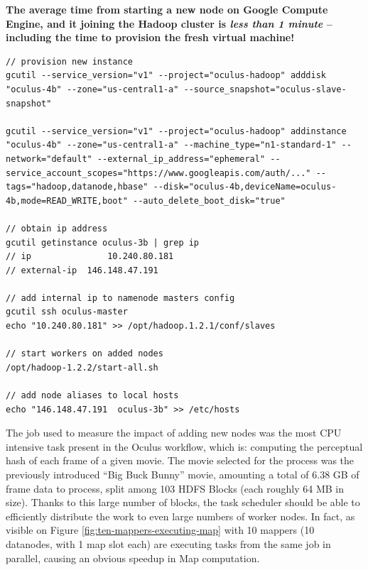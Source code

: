 \textbf{The average time from starting a new node on Google Compute Engine, and it joining the Hadoop cluster is \textit{less than 1 minute} -- including the time to provision the fresh virtual machine!}

\newpage
\begin{lstlisting}[caption={Complete listing of adding a new worker node to the cluster, using GCE}, label={lst:adding-new-node-cluster}]
// provision new instance
gcutil --service_version="v1" --project="oculus-hadoop" adddisk "oculus-4b" --zone="us-central1-a" --source_snapshot="oculus-slave-snapshot"

gcutil --service_version="v1" --project="oculus-hadoop" addinstance "oculus-4b" --zone="us-central1-a" --machine_type="n1-standard-1" --network="default" --external_ip_address="ephemeral" --service_account_scopes="https://www.googleapis.com/auth/..." --tags="hadoop,datanode,hbase" --disk="oculus-4b,deviceName=oculus-4b,mode=READ_WRITE,boot" --auto_delete_boot_disk="true"

// obtain ip address
gcutil getinstance oculus-3b | grep ip
// ip               10.240.80.181
// external-ip  146.148.47.191

// add internal ip to namenode masters config
gcutil ssh oculus-master
echo "10.240.80.181" >> /opt/hadoop.1.2.1/conf/slaves

// start workers on added nodes
/opt/hadoop-1.2.2/start-all.sh

// add node aliases to local hosts
echo "146.148.47.191  oculus-3b" >> /etc/hosts
\end{lstlisting}

The job used to measure the impact of adding new nodes was the most CPU intensive task present in the Oculus workflow, which is: computing the perceptual hash of each frame of a given movie. The movie selected for the process was the previously introduced ``Big Buck Bunny'' movie, amounting a total of 6.38 GB of frame data to process, split among 103 HDFS Blocks (each roughly 64 MB in size). Thanks to this large number of blocks, the task scheduler should be able to efficiently distribute the work to even large numbers of worker nodes. In fact, as visible on Figure \ref{fig:ten-mappers-executing-map} with 10 mappers (10 datanodes, with 1 map slot each) are executing tasks from the same job in parallel, causing an obvious speedup in Map computation.


